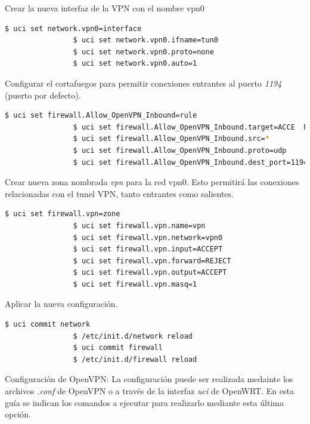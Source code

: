 \documentclass{article}
\begin{document}
            Crear la nueva interfaz de la VPN con el nombre vpn0
                
            \begin{lstlisting}[language=bash]
                $ uci set network.vpn0=interface
                $ uci set network.vpn0.ifname=tun0
                $ uci set network.vpn0.proto=none
                $ uci set network.vpn0.auto=1        
            \end{lstlisting}

            Configurar el cortafuegos para permitir conexiones entrantes al puerto \textit{1194} (puerto por defecto).

            \begin{lstlisting}[language=bash]
                $ uci set firewall.Allow_OpenVPN_Inbound=rule
                $ uci set firewall.Allow_OpenVPN_Inbound.target=ACCE  PT
                $ uci set firewall.Allow_OpenVPN_Inbound.src=*
                $ uci set firewall.Allow_OpenVPN_Inbound.proto=udp
                $ uci set firewall.Allow_OpenVPN_Inbound.dest_port=1194    
            \end{lstlisting}

            Crear nueva zona nombrada \textit{vpn} para la red vpn0. Esto permitirá las conexiones relacionadas con el tunel VPN, tanto entrantes como salientes.

            \begin{lstlisting}[language=bash]
                $ uci set firewall.vpn=zone
                $ uci set firewall.vpn.name=vpn
                $ uci set firewall.vpn.network=vpn0
                $ uci set firewall.vpn.input=ACCEPT
                $ uci set firewall.vpn.forward=REJECT
                $ uci set firewall.vpn.output=ACCEPT
                $ uci set firewall.vpn.masq=1   
            \end{lstlisting}

            Aplicar la nueva configuración.

            \begin{lstlisting}[language=bash]
                $ uci commit network
                $ /etc/init.d/network reload
                $ uci commit firewall
                $ /etc/init.d/firewall reload  
            \end{lstlisting}

            Configuración de OpenVPN:
            La configuración puede ser realizada medainte los archivos \textit{.conf} de OpenVPN o a través de la interfaz \textit{uci} de OpenWRT. En esta guía se indican los comandos a ejecutar para realizarlo mediante esta última opción.
\end{document}
